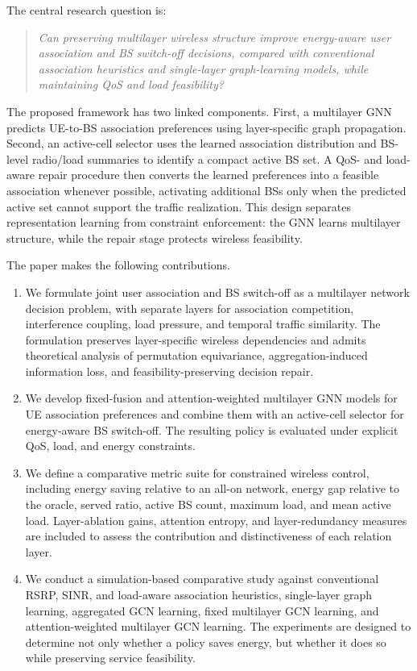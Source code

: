 \documentclass[journal]{IEEEtran}
\begin{document}
The central research question is:
\begin{quote}
\emph{Can preserving multilayer wireless structure improve energy-aware user
association and BS switch-off decisions, compared with conventional association
heuristics and single-layer graph-learning models, while maintaining QoS and
load feasibility?}
\end{quote}

The proposed framework has two linked components. First, a multilayer GNN
predicts UE-to-BS association preferences using layer-specific graph
propagation. Second, an active-cell selector uses the learned association
distribution and BS-level radio/load summaries to identify a compact active BS
set. A QoS- and load-aware repair procedure then converts the learned
preferences into a feasible association whenever possible, activating
additional BSs only when the predicted active set cannot support the traffic
realization. This design separates representation learning from constraint
enforcement: the GNN learns multilayer structure, while the repair stage
protects wireless feasibility.

The paper makes the following contributions.
\begin{enumerate}
    \item We formulate joint user association and BS switch-off as a multilayer
    network decision problem, with separate layers for association competition,
    interference coupling, load pressure, and temporal traffic similarity.
    The formulation preserves layer-specific wireless dependencies and admits
    theoretical analysis of permutation equivariance, aggregation-induced
    information loss, and feasibility-preserving decision repair.

    \item We develop fixed-fusion and attention-weighted multilayer GNN models
    for UE association preferences and combine them with an active-cell
    selector for energy-aware BS switch-off. The resulting policy is evaluated
    under explicit QoS, load, and energy constraints.

    \item We define a comparative metric suite for constrained wireless
    control, including energy saving relative to an all-on network, energy gap
    relative to the oracle, served ratio, active BS count, maximum load, and
    mean active load. Layer-ablation gains, attention entropy, and
    layer-redundancy measures are included to assess the contribution and
    distinctiveness of each relation layer.

    \item We conduct a simulation-based comparative study against conventional
    RSRP, SINR, and load-aware association heuristics, single-layer graph
    learning, aggregated GCN learning, fixed multilayer GCN learning, and
    attention-weighted multilayer GCN learning. The experiments are designed
    to determine not only whether a policy saves energy, but whether it does
    so while preserving service feasibility.
\end{enumerate}
\end{document}
